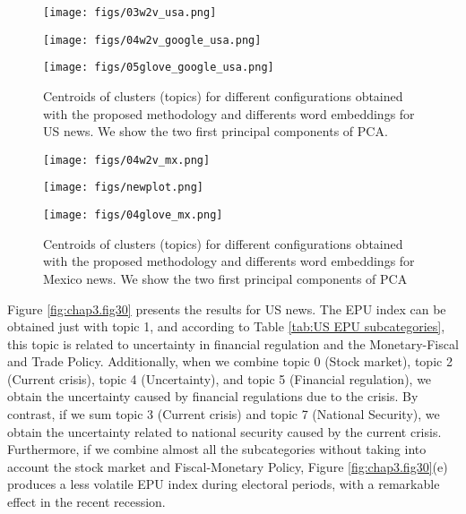 \documentclass{article}
\begin{document}
\begin{figure}[h] 
 \begin{minipage}[b]{0.3\linewidth}
    \centering
    \texttt{[image: figs/03w2v\_usa.png]}
    \end{minipage}
    \begin{minipage}[b]{0.3\linewidth}
    \centering
  \texttt{[image: figs/04w2v\_google\_usa.png]}
  \end{minipage}
   \begin{minipage}[b]{0.3\linewidth}
    \centering
  \texttt{[image: figs/05glove\_google\_usa.png]}
  \end{minipage}
  \caption{Centroids of clusters (topics) for different configurations obtained with the proposed methodology and differents word embeddings for US news. We show the two first principal components of PCA.}
    \label{fig:chap3.fig19}
\end{figure}

\begin{figure}[h] 
   \begin{minipage}[b]{0.3\linewidth}
    \centering
    \texttt{[image: figs/04w2v\_mx.png]}
    \end{minipage}
    \begin{minipage}[b]{0.3\linewidth}
    \centering
  \texttt{[image: figs/newplot.png]}
  \end{minipage}
   \begin{minipage}[b]{0.3\linewidth}
    \centering
  \texttt{[image: figs/04glove\_mx.png]}
  \end{minipage}
\caption{Centroids of clusters (topics) for different configurations obtained with the proposed methodology and differents word embeddings for Mexico news. We show the two first principal components of PCA}
    \label{fig:chap3.fig20}
\end{figure}

Figure \ref{fig:chap3.fig30} presents the results for US news. The EPU index can be obtained just with topic 1, and according to Table \ref{tab:US EPU subcategories}, this topic is related to uncertainty in financial regulation and the Monetary-Fiscal and Trade Policy. Additionally, when we combine topic 0 (Stock market), topic 2 (Current crisis), topic 4 (Uncertainty), and topic 5 (Financial regulation), we obtain the uncertainty caused by financial regulations due to the crisis. By contrast, if we sum topic 3 (Current crisis) and topic 7 (National Security), we obtain the uncertainty related to national security caused by the current crisis. Furthermore, if we combine almost all the subcategories without taking into account the stock market and Fiscal-Monetary Policy, Figure \ref{fig:chap3.fig30}(e)  produces a less volatile EPU index during electoral periods, with a remarkable effect in the recent recession. 
\end{document}
